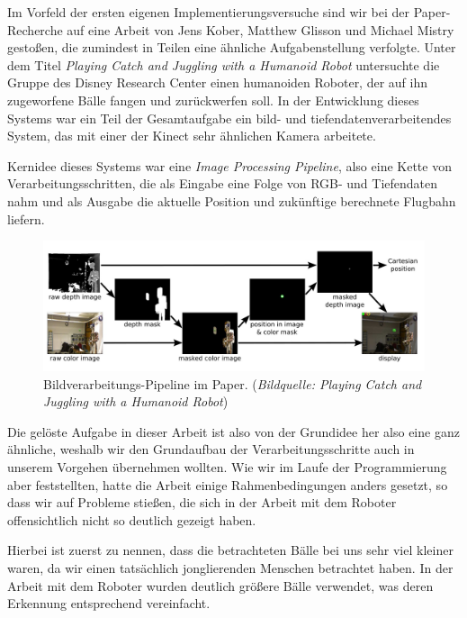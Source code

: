 \documentclass[12pt,a4paper,ngerman]{scrartcl}
\begin{document}
Im Vorfeld der ersten eigenen Implementierungsversuche sind wir bei der
Paper-Recherche auf eine Arbeit von Jens Kober, Matthew Glisson und Michael Mistry
gestoßen, die zumindest in Teilen eine ähnliche Aufgabenstellung verfolgte.
Unter dem Titel {\em Playing Catch and Juggling with a Humanoid Robot}\cite{kober}
untersuchte die Gruppe des Disney Research Center\cite{disneyresearch} einen
humanoiden Roboter, der auf ihn zugeworfene Bälle fangen und zurückwerfen soll.
In der Entwicklung dieses Systems war ein Teil der Gesamtaufgabe ein
bild- und tiefendatenverarbeitendes System, das mit einer der Kinect sehr ähnlichen
Kamera arbeitete.

Kernidee dieses Systems war eine \textit{Image Processing Pipeline}, also eine
Kette von Verarbeitungsschritten, die als Eingabe eine Folge von RGB- und Tiefendaten
nahm und als Ausgabe die aktuelle Position und zukünftige berechnete Flugbahn
liefern.

\begin{figure}[H]
    \centering
    \includegraphics[scale=0.31]{img/koberpipeline.jpg}
    \caption{Bildverarbeitungs-Pipeline im Paper. ({\em Bildquelle: Playing Catch and Juggling with a Humanoid Robot\cite{kober}})}
    \label{koberpipeline}
\end{figure}

Die gelöste Aufgabe in dieser Arbeit ist also von der Grundidee her also eine ganz
ähnliche, weshalb wir den Grundaufbau der Verarbeitungsschritte auch in unserem
Vorgehen übernehmen wollten. Wie wir im Laufe der Programmierung aber feststellten,
hatte die Arbeit einige Rahmenbedingungen anders gesetzt, so dass wir auf Probleme
stießen, die sich in der Arbeit mit dem Roboter offensichtlich nicht so deutlich
gezeigt haben.

Hierbei ist zuerst zu nennen, dass die betrachteten Bälle bei uns sehr viel kleiner
waren, da wir einen tatsächlich jonglierenden Menschen betrachtet haben. In der
Arbeit mit dem Roboter wurden deutlich größere Bälle verwendet, was deren Erkennung
entsprechend vereinfacht.
\end{document}
